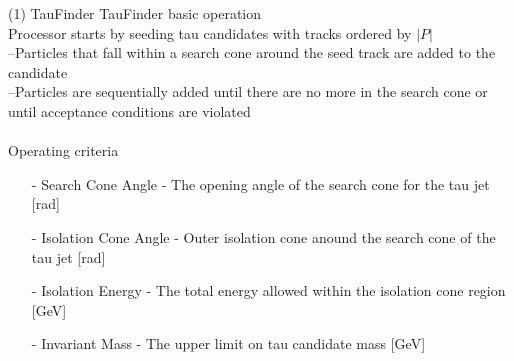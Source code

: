 \documentclass[10pt]{beamer}
\begin{document}
\begin{frame}{(1) TauFinder}
TauFinder basic operation\\
Processor starts by seeding tau candidates with tracks ordered by $|P|$\\
\quad --Particles that fall within a search cone around the seed track are added to the candidate\\
\quad --Particles are sequentially added until there are no more in the search cone or until acceptance conditions are violated\\
\quad \quad \\
\quad \quad Operating criteria\\

 \begin{itemize}
 \scriptsize
 	\item[-]Search Cone Angle - The opening angle of the search cone for the tau jet [rad]
 	\item[-]Isolation Cone Angle - Outer isolation cone anound the search cone of the tau jet [rad]
 	\item[-]Isolation Energy - The total energy allowed within the isolation cone region [GeV]
 	\item[-]Invariant Mass - The upper limit on tau candidate mass [GeV]
 \end{itemize}
\end{frame}
\end{document}
